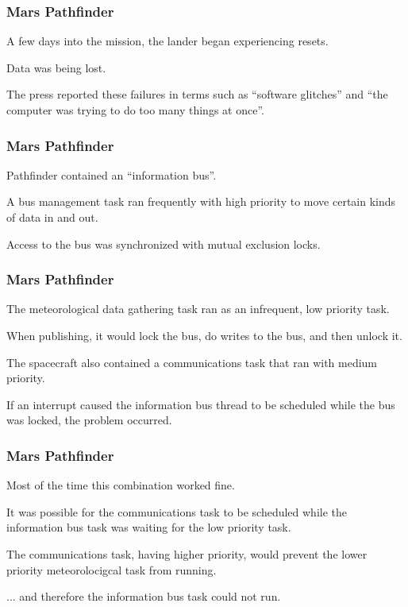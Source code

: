\begin{frame}
\frametitle{Mars Pathfinder}
\begin{changemargin}{1cm}

A few days into the mission, the lander began experiencing resets.

Data was being lost.

The press reported these failures in terms such as ``software glitches'' and ``the computer was trying to do too many things at once''.

\end{changemargin}
\end{frame}

\begin{frame}
\frametitle{Mars Pathfinder}
\begin{changemargin}{1cm}

Pathfinder contained an ``information bus''.

A bus management task ran frequently with high priority to move certain kinds of data in and out.

Access to the bus was synchronized with mutual exclusion locks.

\end{changemargin}
\end{frame}

\begin{frame}
\frametitle{Mars Pathfinder}
\begin{changemargin}{1cm}

The meteorological data gathering task ran as an infrequent, low priority task.

When publishing, it would lock the bus, do writes to the bus, and then unlock it.

The spacecraft also contained a communications task that ran with medium priority.

If an interrupt caused the information bus thread to be scheduled while the bus was locked, the problem occurred.

\end{changemargin}
\end{frame}

\begin{frame}
\frametitle{Mars Pathfinder}
\begin{changemargin}{1cm}
Most of the time this combination worked fine. 

It was possible for the communications task to be scheduled while the information bus task was waiting for the low priority task.

The communications task, having higher priority, would prevent the lower priority meteorolocigcal task from running.

... and therefore the information bus task could not run.

\end{changemargin}
\end{frame}


